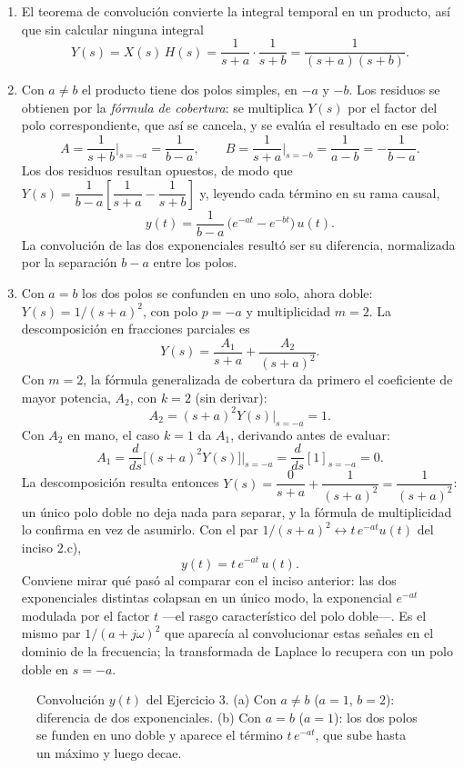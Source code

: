\documentclass[10pt,a4paper]{article}
\begin{document}
\begin{enumerate}
	\item El teorema de convolución convierte la integral temporal en un
	producto, así que sin calcular ninguna integral
	\[
		Y(s)=X(s)\,H(s)=\frac{1}{s+a}\cdot\frac{1}{s+b}=\frac{1}{(s+a)(s+b)}.
	\]

	\item Con $a\neq b$ el producto tiene dos polos simples, en $-a$ y $-b$.
	Los residuos se obtienen por la \emph{fórmula de cobertura}: se
	multiplica $Y(s)$ por el factor del polo correspondiente, que así se
	cancela, y se evalúa el resultado en ese polo:
	\[
		A=\frac{1}{s+b}\bigg|_{s=-a}=\frac{1}{b-a},
		\qquad
		B=\frac{1}{s+a}\bigg|_{s=-b}=\frac{1}{a-b}=-\frac{1}{b-a}.
	\]
	Los dos residuos resultan opuestos, de modo que
	$Y(s)=\dfrac{1}{b-a}\left[\dfrac{1}{s+a}-\dfrac{1}{s+b}\right]$ y, leyendo
	cada término en su rama causal,
	\[
		y(t)=\frac{1}{b-a}\,\bigl(e^{-at}-e^{-bt}\bigr)\,u(t).
	\]
	La convolución de las dos exponenciales resultó ser su diferencia,
	normalizada por la separación $b-a$ entre los polos.

	\item Con $a=b$ los dos polos se confunden en uno solo, ahora doble:
	$Y(s)=1/(s+a)^2$, con polo $p=-a$ y multiplicidad $m=2$. La
	descomposición en fracciones parciales es
	\[
		Y(s)=\frac{A_1}{s+a}+\frac{A_2}{(s+a)^2}.
	\]
	Con $m=2$, la fórmula generalizada de cobertura da primero el
	coeficiente de mayor potencia, $A_2$, con $k=2$ (sin derivar):
	\[
		A_2=(s+a)^2Y(s)\big|_{s=-a}=1.
	\]
	Con $A_2$ en mano, el caso $k=1$ da $A_1$, derivando antes de evaluar:
	\[
		A_1=\frac{d}{ds}\bigl[(s+a)^2Y(s)\bigr]\bigg|_{s=-a}
		   =\frac{d}{ds}[1]_{s=-a}=0.
	\]
	La descomposición resulta entonces $Y(s)=\dfrac{0}{s+a}+\dfrac{1}{(s+a)^2}
	=\dfrac{1}{(s+a)^2}$: un único polo doble no deja nada para separar, y la
	fórmula de multiplicidad lo confirma en vez de
	asumirlo. Con el par $1/(s+a)^2\leftrightarrow t\,e^{-at}u(t)$ del
	inciso 2.c),
	\[
		y(t)=t\,e^{-at}\,u(t).
	\]
	Conviene mirar qué pasó al comparar con el inciso anterior: las dos
	exponenciales distintas colapsan en un único modo, la exponencial
	$e^{-at}$ modulada por el factor $t$ ---el rasgo característico del polo
	doble---. Es el mismo par $1/(a+j\omega)^2$ que aparecía al convolucionar
	estas señales en el dominio de la frecuencia; la transformada de Laplace lo
	recupera con un polo doble en $s=-a$.
\end{enumerate}

\begin{figure}[h]
	\centering
	
	\caption{Convolución $y(t)$ del Ejercicio 3. (a) Con $a\neq b$ ($a=1$,
	$b=2$): diferencia de dos exponenciales. (b) Con $a=b$ ($a=1$): los dos
	polos se funden en uno doble y aparece el término $t\,e^{-at}$, que sube
	hasta un máximo y luego decae.}
	\label{fig:res_conv}
\end{figure}
\end{document}

